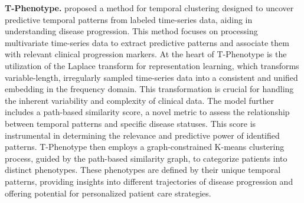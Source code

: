 \documentclass[pmlr,twocolumn,10pt]{jmlr} %
\begin{document}
\vspace{.2em}
\noindent
\textbf{T-Phenotype.}
\citet{qin2023t} proposed a method for temporal clustering designed to uncover predictive temporal patterns from labeled time-series data, aiding in understanding disease progression. This method focuses on processing multivariate time-series data to extract predictive patterns and associate them with relevant clinical progression markers. At the heart of T-Phenotype is the utilization of the Laplace transform for representation learning, which transforms variable-length, irregularly sampled time-series data into a consistent and unified embedding in the frequency domain. This transformation is crucial for handling the inherent variability and complexity of clinical data. The model further includes a path-based similarity score, a novel metric to assess the relationship between temporal patterns and specific disease statuses. This score is instrumental in determining the relevance and predictive power of identified patterns. T-Phenotype then employs a graph-constrained K-means clustering process, guided by the path-based similarity graph, to categorize patients into distinct phenotypes. These phenotypes are defined by their unique temporal patterns, providing insights into different trajectories of disease progression and offering potential for personalized patient care strategies.
\end{document}
